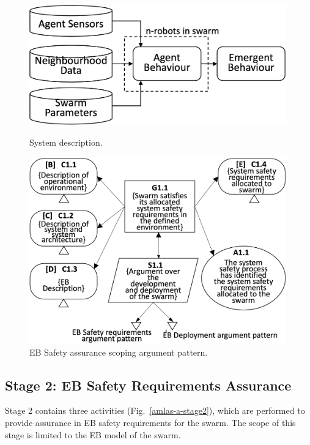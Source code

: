\documentclass[runningheads]{llncs}
\begin{document}
\begin{figure}[!t]
	\centering
	\begin{minipage}{.5\textwidth}
		\centering
		\includegraphics[width=0.99\textwidth]{figures/stage1-systema-v2.png}
		\caption{System description.}
		\label{system-description}
	\end{minipage}%
	\begin{minipage}{.45\textwidth}
		\centering
		\includegraphics[width=0.99\textwidth]{figures/stage1-argumentpattern-v3.png}
		\vspace{-5ex}
		\caption{EB Safety assurance scoping argument pattern.}
		\label{stage1-ap}
	\end{minipage}	
	\vspace{-4ex}
\end{figure}

\subsection{Stage 2: EB Safety Requirements Assurance} \label{framework-stage2}
Stage 2 contains three activities (Fig.~\ref{amlas-a-stage2}), which are performed to provide assurance in EB safety requirements for the swarm. 
The scope of this stage is limited to the EB model of the swarm.
\end{document}
